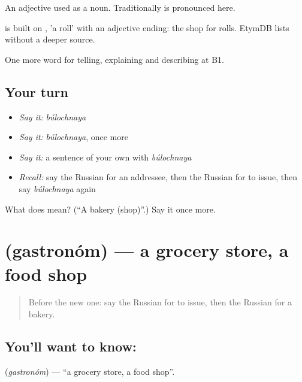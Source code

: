 An adjective used as a noun. Traditionally \emph{} is pronounced \emph{} here.

\begin{cousinweb}
\emph{} is built on \emph{}, \emph{} 'a roll' with an adjective ending: the shop for rolls. EtymDB lists \emph{} without a deeper source.
\end{cousinweb}

\begin{grammarlens}[title={What you've built}]
One more word for telling, explaining and describing at B1.
\end{grammarlens}

\subsection*{Your turn}
\begin{itemize}
\raggedright
  \item \emph{Say it:} \emph{búlochnaya}
  \item \emph{Say it:} \emph{búlochnaya}, once more
  \item \emph{Say it:} a sentence of your own with \emph{búlochnaya}
  \item \emph{Recall:} say the Russian for an addressee, then the Russian for to issue, then say \emph{búlochnaya} again
\end{itemize}

\begin{tcolorbox}[breakable,colback=teal!4,colframe=teal!35!black,title={Before you move on}]
What does  mean? (\textquotedblleft{}A bakery (shop)\textquotedblright{}.) Say it once more.
\end{tcolorbox}
\section[\texorpdfstring{\ru{гастроном} (gastronóm)}{гастроном (gastronóm)}]{ (gastronóm) — a grocery store, a food shop}

\label{lesson:RU-C452-gastronom}



\begin{quote}
Before the new one: say the Russian for to issue, then the Russian for a bakery.
\end{quote}

\subsection*{You'll want to know: }
\textbf{} (\emph{gastronóm}) — \textquotedblleft{}a grocery store, a food shop\textquotedblright{}.


